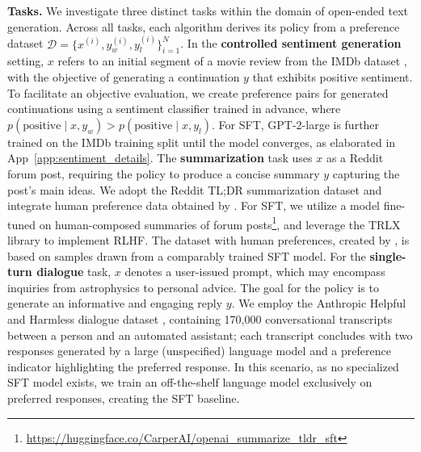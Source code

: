 \textbf{Tasks.} We investigate three distinct tasks within the domain of open-ended text generation. Across all tasks, each algorithm derives its policy from a preference dataset $\mathcal{D}=\bigl\{x^{(i)}, y_w^{(i)}, y_l^{(i)}\bigr\}_{i=1}^N$. In the \textbf{controlled sentiment generation} setting, $x$ refers to an initial segment of a movie review from the IMDb dataset \cite{maas-EtAl:2011:ACL-HLT2011}, with the objective of generating a continuation $y$ that exhibits positive sentiment. To facilitate an objective evaluation, we create preference pairs for generated continuations using a sentiment classifier trained in advance, where $p(\text{positive}\mid x,y_w)>p(\text{positive}\mid x,y_l)$. For SFT, GPT-2-large is further trained on the IMDb training split until the model converges, as elaborated in App~\ref{app:sentiment_details}. The \textbf{summarization} task uses $x$ as a Reddit forum post, requiring the policy to produce a concise summary $y$ capturing the post's main ideas. We adopt the Reddit TL;DR summarization dataset \citep{volske-etal-2017-tl} and integrate human preference data obtained by \citeauthor{stiennon2022learning}. For SFT, we utilize a model fine-tuned on human-composed summaries of forum posts\footnote{\url{https://huggingface.co/CarperAI/openai_summarize_tldr_sft}}, and leverage the TRLX \citep{leandro_von_werra_2023_7790115} library to implement RLHF. The dataset with human preferences, created by \citeauthor{stiennon2022learning}, is based on samples drawn from a comparably trained SFT model. For the \textbf{single-turn dialogue} task, $x$ denotes a user-issued prompt, which may encompass inquiries from astrophysics to personal advice. The goal for the policy is to generate an informative and engaging reply $y$. We employ the Anthropic Helpful and Harmless dialogue dataset \citep{bai2022training}, containing 170,000 conversational transcripts between a person and an automated assistant; each transcript concludes with two responses generated by a large (unspecified) language model and a preference indicator highlighting the preferred response. In this scenario, as no specialized SFT model exists, we train an off-the-shelf language model exclusively on preferred responses, creating the SFT baseline.

